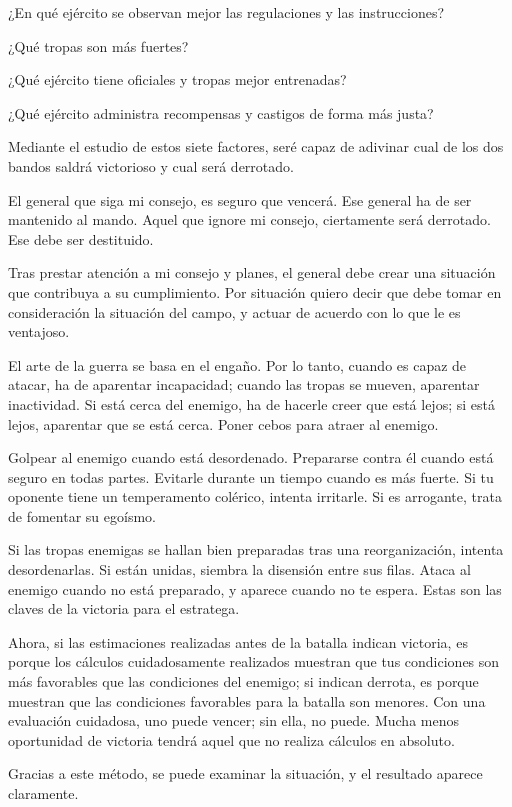 ¿En qué ejército se observan mejor las regulaciones y las instrucciones?

¿Qué tropas son más fuertes?

¿Qué ejército tiene oficiales y tropas mejor entrenadas?

¿Qué ejército administra recompensas y castigos de forma más justa?

Mediante el estudio de estos siete factores, seré capaz de adivinar cual de los dos bandos saldrá victorioso y cual será derrotado.

El general que siga mi consejo, es seguro que vencerá. Ese general ha de ser mantenido al mando. Aquel que ignore mi consejo, ciertamente será derrotado. Ese debe ser destituido.

Tras prestar atención a mi consejo y planes, el general debe crear una situación que contribuya a su cumplimiento. Por situación quiero decir que debe tomar en consideración la situación del campo, y actuar de acuerdo con lo que le es ventajoso.

El arte de la guerra se basa en el engaño. Por lo tanto, cuando es capaz de atacar, ha de aparentar incapacidad; cuando las tropas se mueven, aparentar inactividad. Si está cerca del enemigo, ha de hacerle creer que está lejos; si está lejos, aparentar que se está cerca. Poner cebos para atraer al enemigo.

Golpear al enemigo cuando está desordenado. Prepararse contra él cuando está seguro en todas partes. Evitarle durante un tiempo cuando es más fuerte. Si tu oponente tiene un temperamento colérico, intenta irritarle. Si es arrogante, trata de fomentar su egoísmo.

Si las tropas enemigas se hallan bien preparadas tras una reorganización, intenta desordenarlas. Si están unidas, siembra la disensión entre sus filas. Ataca al enemigo cuando no está preparado, y aparece cuando no te espera. Estas son las claves de la victoria para el estratega.

Ahora, si las estimaciones realizadas antes de la batalla indican victoria, es porque los cálculos cuidadosamente realizados muestran que tus condiciones son más favorables que las condiciones del enemigo; si indican derrota, es porque muestran que las condiciones favorables para la batalla son menores. Con una evaluación cuidadosa, uno puede vencer; sin ella, no puede. Mucha menos oportunidad de victoria tendrá aquel que no realiza cálculos en absoluto.

Gracias a este método, se puede examinar la situación, y el resultado aparece claramente. 

